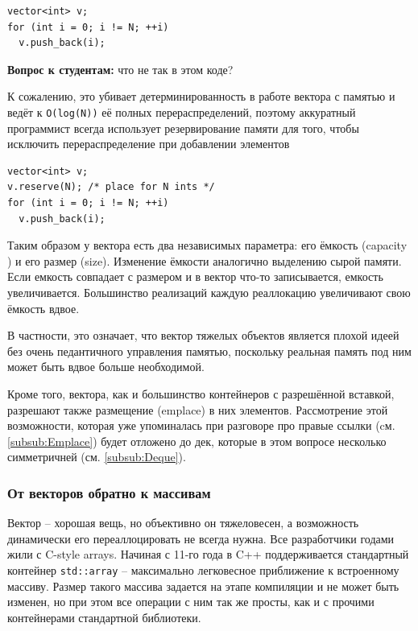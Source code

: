 \documentclass[a4paper,12pt,oneside]{article}
\newif\ifanswers
\begin{document}
\begin{lstlisting}
vector<int> v;
for (int i = 0; i != N; ++i)
  v.push_back(i);
\end{lstlisting}

\textbf{Вопрос к студентам:} что не так в этом коде?

\ifanswers
См. ответ далее в тексте лекций
\fi

К сожалению, это убивает детерминированность в работе вектора с памятью и ведёт к \lstinline!O(log(N))! её полных перераспределений, поэтому аккуратный программист всегда использует резервирование памяти для того, чтобы исключить перераспределение при добавлении элементов

\begin{lstlisting}
vector<int> v;
v.reserve(N); /* place for N ints */
for (int i = 0; i != N; ++i)
  v.push_back(i);
\end{lstlisting}

Таким образом у вектора есть два независимых параметра: его ёмкость (capacity ) и его размер (size). Изменение ёмкости аналогично выделению сырой памяти. Если емкость совпадает с размером и в вектор что-то записывается, емкость увеличивается. Большинство реализаций каждую реаллокацию увеличивают свою ёмкость вдвое.

В частности, это означает, что вектор тяжелых объектов является плохой идеей без очень педантичного управления памятью, поскольку реальная память под ним может быть вдвое больше необходимой. 

Кроме того, вектора, как и большинство контейнеров с разрешённой вставкой, разрешают также размещение (emplace) в них элементов. Рассмотрение этой возможности, которая уже упоминалась при разговоре про правые ссылки (cм. \ref{subsub:Emplace}) будет отложено до дек, которые в этом вопросе несколько симметричней (см. \ref{subsub:Deque}).

\subsubsection{От векторов обратно к массивам}\label{InvArrays}

Вектор -- хорошая вещь, но объективно он тяжеловесен, а возможность динамически его переаллоцировать не всегда нужна. Все разработчики годами жили с C-style arrays. Начиная с 11-го года в C++ поддерживается стандартный контейнер \lstinline!std::array! -- максимально легковесное приближение к встроенному массиву. Размер такого массива задается на этапе компиляции и не может быть изменен, но при этом все операции с ним так же просты, как и с прочими контейнерами стандартной библиотеки.
\end{document}
